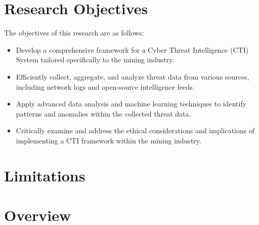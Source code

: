\documentclass[a4paper,twoside,12pt]{report}
\begin{document}
\section{Research Objectives}

The objectives of this research are as follows:

\begin{itemize}
    \item Develop a comprehensive framework for a Cyber Threat Intelligence (CTI) System tailored specifically to the mining industry.
    \item Efficiently collect, aggregate, and analyze threat data from various sources, including network logs and open-source intelligence feeds.
    \item Apply advanced data analysis and machine learning techniques to identify patterns and anomalies within the collected threat data.
    \item Critically examine and address the ethical considerations and implications of implementing a CTI framework within the mining industry.
\end{itemize}
\section{Limitations}
\section{Overview}


\end{document}

